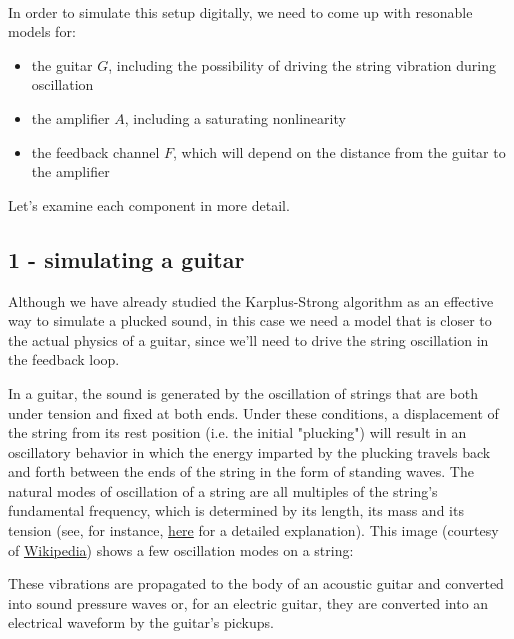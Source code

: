 \documentclass[11pt]{article}
\providecommand{\tightlist}{%
      \setlength{\itemsep}{0pt}\setlength{\parskip}{0pt}}
\begin{document}
    \begin{center}
    \end{center}
    { \hspace*{\fill} \\}
    
    In order to simulate this setup digitally, we need to come up with
resonable models for:

\begin{itemize}
\tightlist
\item
  the guitar \(G\), including the possibility of driving the string
  vibration during oscillation
\item
  the amplifier \(A\), including a saturating nonlinearity
\item
  the feedback channel \(F\), which will depend on the distance from the
  guitar to the amplifier
\end{itemize}

Let's examine each component in more detail.

    \subsection{1 - simulating a guitar}\label{simulating-a-guitar}

    Although we have already studied the Karplus-Strong algorithm as an
effective way to simulate a plucked sound, in this case we need a model
that is closer to the actual physics of a guitar, since we'll need to
drive the string oscillation in the feedback loop.

In a guitar, the sound is generated by the oscillation of strings that
are both under tension and fixed at both ends. Under these conditions, a
displacement of the string from its rest position (i.e. the initial
"plucking") will result in an oscillatory behavior in which the energy
imparted by the plucking travels back and forth between the ends of the
string in the form of standing waves. The natural modes of oscillation
of a string are all multiples of the string's fundamental frequency,
which is determined by its length, its mass and its tension (see, for
instance, \href{http://www.phys.unsw.edu.au/jw/strings.html}{here} for a
detailed explanation). This image (courtesy of
\href{http://en.wikipedia.org/wiki/Vibrating_string}{Wikipedia}) shows a
few oscillation modes on a string:

These vibrations are propagated to the body of an acoustic guitar and
converted into sound pressure waves or, for an electric guitar, they are
converted into an electrical waveform by the guitar's pickups.
\end{document}
